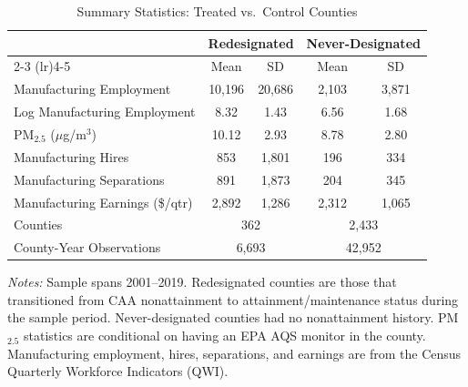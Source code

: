 \begin{table}[t]
\centering
\begin{threeparttable}
\caption{Summary Statistics: Treated vs.\ Control Counties}
\label{tab:summary}
\begin{tabular}{lcccc}
\toprule
 & \multicolumn{2}{c}{Redesignated} & \multicolumn{2}{c}{Never-Designated} \\
\cmidrule(lr){2-3} \cmidrule(lr){4-5}
 & Mean & SD & Mean & SD \\
\midrule
  Manufacturing Employment & 10,196 & 20,686 & 2,103 & 3,871 \\
  Log Manufacturing Employment & 8.32 & 1.43 & 6.56 & 1.68 \\
  PM$_{2.5}$ ($\mu$g/m$^3$) & 10.12 & 2.93 & 8.78 & 2.80 \\
  Manufacturing Hires & 853 & 1,801 & 196 & 334 \\
  Manufacturing Separations & 891 & 1,873 & 204 & 345 \\
  Manufacturing Earnings (\$/qtr) & 2,892 & 1,286 & 2,312 & 1,065 \\
\midrule
  Counties & \multicolumn{2}{c}{362} & \multicolumn{2}{c}{2,433} \\
  County-Year Observations & \multicolumn{2}{c}{6,693} & \multicolumn{2}{c}{42,952} \\
\bottomrule
\end{tabular}
\begin{tablenotes}[flushleft]
\small
\item \textit{Notes:} Sample spans 2001--2019. Redesignated counties are those that transitioned from CAA nonattainment to attainment/maintenance status during the sample period. Never-designated counties had no nonattainment history. PM$_{2.5}$ statistics are conditional on having an EPA AQS monitor in the county. Manufacturing employment, hires, separations, and earnings are from the Census Quarterly Workforce Indicators (QWI).
\end{tablenotes}
\end{threeparttable}
\end{table}
